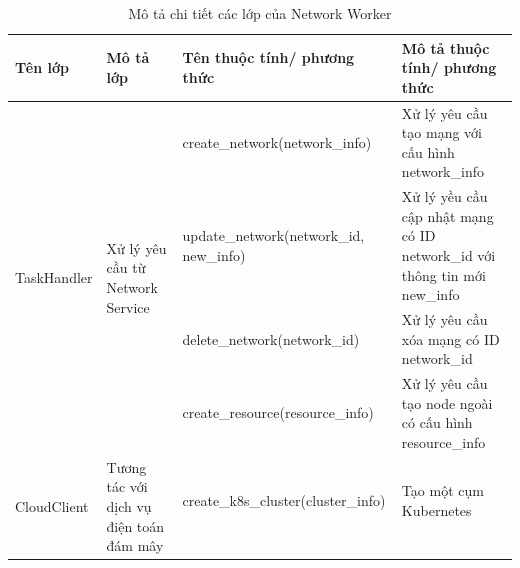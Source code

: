 \documentclass[../DoAn.tex]{subfiles}
\begin{document}
\begin{longtable}{|p{}|p{}|p{}|p{}|}
    \caption{Mô tả chi tiết các lớp của Network Worker}
    \label{tab:classNetworkWorker}                                                                                                                                                                                                                                          \\
    \hline
    Tên lớp                                       & Mô tả lớp                                                                 & Tên thuộc tính/ phương thức                                     & Mô tả thuộc tính/ phương thức                                             \\ \hline
    \endhead
    \multirow[t]{4}{0.175\textwidth}{TaskHandler} & \multirow[t]{4}{0.175\textwidth}{Xử lý yêu cầu từ Network Service}        & create\_network\hspace{0pt}(network\_info)                      & Xử lý yêu cầu tạo mạng với cấu hình network\_info                         \\ \hline
                                                  &                                                                           & update\_network\hspace{0pt}(network\_id, new\_info)             & Xử lý yều cầu cập nhật mạng có ID network\_id với thông tin mới new\_info \\ \cline{3-4}
                                                  &                                                                           & delete\_network\hspace{0pt}(network\_id)                        & Xử lý yêu cầu xóa mạng có ID network\_id                                  \\ \cline{3-4}
                                                  &                                                                           & create\_resource\hspace{0pt}(resource\_info)                    & Xử lý yêu cầu tạo node ngoài có cấu hình resource\_info                   \\ \hline
    \multirow[t]{2}{0.175\textwidth}{CloudClient} & \multirow[t]{2}{0.175\textwidth}{Tương tác với dịch vụ điện toán đám mây} & create\_k8s\_cluster\hspace{0pt}(cluster\_info)                 & Tạo một cụm Kubernetes                                                    \\ \cline{3-4}

\end{longtable}
\end{document}
